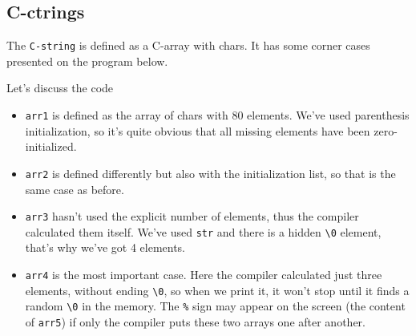 \documentclass[../main]{subfiles}
\begin{document}
\subsection{C-ctrings}
    The \texttt{C-string} is defined as a C-array with chars. It has some corner cases presented on the program below.

Let's discuss the code
\begin{itemize}
    \item \texttt{arr1} is defined as the array of chars with 80 elements. We've used parenthesis initialization, so it's quite obvious
    that all missing elements have been zero-initialized.
    \item \texttt{arr2} is defined differently but also with the initialization list, so that is the same case as before.
    \item \texttt{arr3} hasn't used the explicit number of elements, thus the compiler calculated them itself.
    We've used \texttt{str} and there is a hidden \texttt{\textbackslash0} element, that's why we've got 4 elements.
    \item \texttt{arr4} is the most important case. Here the compiler calculated just three elements,
    without ending \texttt{\textbackslash0}, so when we print it, it won't stop until it finds a random
    \texttt{\textbackslash0} in the memory. The \texttt{\%} sign may appear on the screen (the content of \texttt{arr5})
    if only the compiler puts these two arrays one after another.
\end{itemize}
\end{document}
